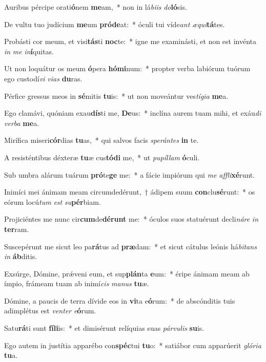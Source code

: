 \item Auribus pércipe orati\textbf{ó}nem \textbf{me}am,~* non in lá\textit{bi}\textit{is} \textit{do}\textbf{ló}sis.
\item De vultu tuo judícium \textbf{me}um \textbf{pród}\textbf{e}at:~* óculi tui víde\textit{ant} \textit{æ}\textit{qui}\textbf{tá}tes.
\item Probásti cor meum, et visi\textbf{tás}ti \textbf{noc}te:~* igne me examinásti, et non est invénta \textit{in} \textit{me} \textit{in}\textbf{í}quitas.
\item Ut non loquátur os meum \textbf{ó}pera \textbf{hó}\textbf{mi}num:~* propter verba labiórum tuórum ego custodí\textit{vi} \textit{vi}\textit{as} \textbf{du}ras.
\item Pérfice gressus meos in \textbf{sé}mitis \textbf{tu}is:~* ut non moveántur ves\textit{tí}\textit{gi}\textit{a} \textbf{me}a.
\item Ego clamávi, quóniam exau\textbf{dís}ti me, \textbf{De}us:~* inclína aurem tuam mihi, et exáu\textit{di} \textit{ver}\textit{ba} \textbf{me}a.
\item Mirífica miseri\textbf{cór}dias \textbf{tu}as,~* qui salvos facis \textit{spe}\textit{rán}\textit{tes} \textbf{in} te.
\item A resisténtibus déxteræ \textbf{tu}æ cus\textbf{tó}\textbf{di} me,~* ut \textit{pu}\textit{píl}\textit{lam} \textbf{ó}culi.
\item Sub umbra alárum tuárum \textbf{pró}te\textbf{ge} me:~* a fácie impiórum qui \textit{me} \textit{af}\textit{fli}\textbf{xé}runt.
\item Inimíci mei ánimam meam circumdedérunt,~† ádipem suum \textbf{con}clu\textbf{sé}runt:~* os eórum locú\textit{tum} \textit{est} \textit{su}\textbf{pér}biam.
\item Projiciéntes me nunc cir\textbf{cum}de\textbf{dé}\textbf{runt} me:~* óculos suos statuérunt decli\textit{ná}\textit{re} \textit{in} \textbf{ter}ram.
\item Suscepérunt me sicut leo pa\textbf{rá}tus ad \textbf{præ}dam:~* et sicut cátulus leónis há\textit{bi}\textit{tans} \textit{in} \textbf{áb}ditis.
\item Exsúrge, Dómine, prǽveni eum, et sup\textbf{plán}ta \textbf{e}um:~* éripe ánimam meam ab ímpio, frámeam tuam ab inimí\textit{cis} \textit{ma}\textit{nus} \textbf{tu}æ.
\item Dómine, a paucis de terra dívide eos in \textbf{vi}ta e\textbf{ó}rum:~* de abscónditis tuis adimplétus est \textit{ven}\textit{ter} \textit{e}\textbf{ó}rum.
\item Satu\textbf{rá}ti sunt \textbf{fí}\textbf{li}is:~* et dimisérunt relíquias suas \textit{pár}\textit{vu}\textit{lis} \textbf{su}is.
\item Ego autem in justítia apparébo con\textbf{spéc}tui \textbf{tu}o:~* satiábor cum apparúerit \textit{gló}\textit{ri}\textit{a} \textbf{tu}a.
